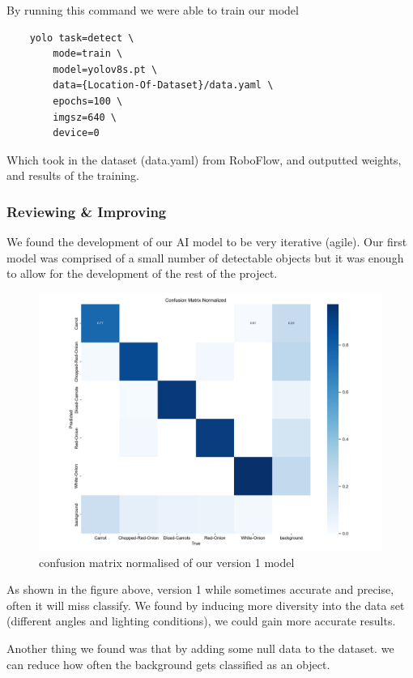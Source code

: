 \documentclass{article}
\begin{document}
By running this command we were able to train our model
\begin{verbatim}
    yolo task=detect \
        mode=train \
        model=yolov8s.pt \
        data={Location-Of-Dataset}/data.yaml \
        epochs=100 \
        imgsz=640 \
        device=0
    \end{verbatim}

Which took in the dataset (data.yaml) from RoboFlow, and outputted weights, and
results of the training.

\subsubsection{Reviewing \& Improving}
We found the development of our AI model to be very iterative (agile). Our
first model was comprised of a small number of detectable objects but it was
enough to allow for the development of the rest of the project.
\begin{figure}[h!]
  \centering
  \includegraphics[width=1\linewidth]{assets/confusion_matrix_normalized-Version-1.png}
  \caption{confusion matrix normalised of our version 1 model}
  \label{fig:enter-label}
\end{figure}

As shown in the figure above, version 1 while sometimes accurate and precise,
often it will miss classify. We found by inducing more diversity into the data
set (different angles and lighting conditions), we could gain more accurate
results.

Another thing we found was that by adding some null data to the dataset. we can
reduce how often the background gets classified as an object.
\end{document}
